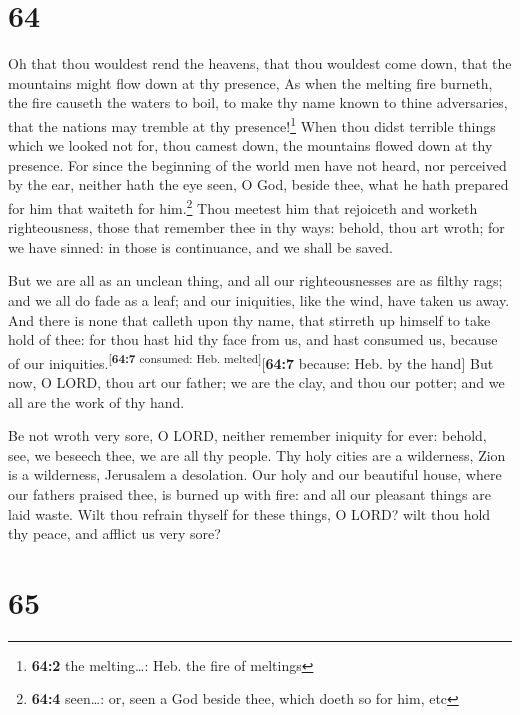 \hypertarget{section-63}{%
\section{64}\label{section-63}}

 Oh that thou wouldest rend the heavens, that thou
wouldest come down, that the mountains might flow down at thy presence,
 As when the melting fire burneth, the fire causeth the
waters to boil, to make thy name known to thine adversaries, that the
nations may tremble at thy presence!\footnote{\textbf{64:2} the
  melting\ldots: Heb. the fire of meltings}  When thou
didst terrible things which we looked not for, thou camest down, the
mountains flowed down at thy presence.  For since the
beginning of the world men have not heard, nor perceived by the ear,
neither hath the eye seen, O God, beside thee, what he hath prepared for
him that waiteth for him.\footnote{\textbf{64:4} seen\ldots: or, seen a
  God beside thee, which doeth so for him, etc}  Thou
meetest him that rejoiceth and worketh righteousness, those that
remember thee in thy ways: behold, thou art wroth; for we have sinned:
in those is continuance, and we shall be saved.

 But we are all as an unclean thing, and all our
righteousnesses are as filthy rags; and we all do fade as a leaf; and
our iniquities, like the wind, have taken us away.  And
there is none that calleth upon thy name, that stirreth up himself to
take hold of thee: for thou hast hid thy face from us, and hast consumed
us, because of our iniquities.\textsuperscript{{[}\textbf{64:7}
consumed: Heb. melted{]}}{[}\textbf{64:7} because: Heb. by the hand{]}
 But now, O LORD, thou art our father; we are the clay,
and thou our potter; and we all are the work of thy hand.

 Be not wroth very sore, O LORD, neither remember iniquity
for ever: behold, see, we beseech thee, we are all thy people.
 Thy holy cities are a wilderness, Zion is a wilderness,
Jerusalem a desolation.  Our holy and our beautiful
house, where our fathers praised thee, is burned up with fire: and all
our pleasant things are laid waste.  Wilt thou refrain
thyself for these things, O LORD? wilt thou hold thy peace, and afflict
us very sore?

\hypertarget{section-64}{%
\section{65}\label{section-64}}

